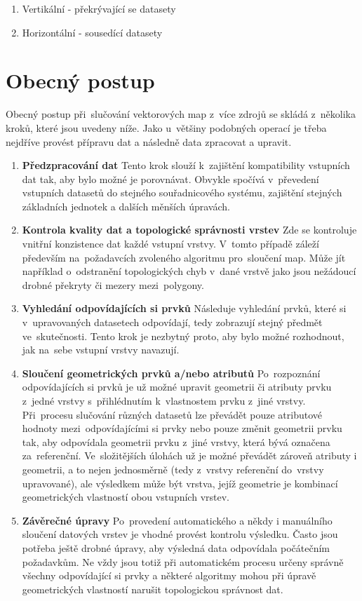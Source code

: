 \begin{enumerate}
  \item Vertikální - překrývající se datasety
  \item Horizontální - sousedící datasety
\end{enumerate}


\section{Obecný postup}

Obecný postup při~slučování vektorových map z~více zdrojů se skládá z~několika kroků, které jsou uvedeny níže. Jako u~většiny podobných operací je třeba nejdříve provést 
přípravu dat a následně data zpracovat a upravit.

\begin{enumerate}
  \item \textbf{Předzpracování dat}
    \subitem Tento krok slouží k~zajištění kompatibility vstupních dat tak, aby bylo možné je porovnávat. Obvykle spočívá v~převedení vstupních datasetů do stejného 
	      souřadnicového systému, zajištění stejných základních jednotek a dalších měnších úpravách. 
  \item \textbf{Kontrola kvality dat a topologické správnosti vrstev}
    \subitem Zde se kontroluje vnitřní konzistence dat každé vstupní vrstvy. V~tomto případě záleží především na~požadavcích zvoleného algoritmu pro~sloučení map. Může jít
	      například o~odstranění topologických chyb v~dané vrstvě jako jsou nežádoucí drobné překryty či mezery mezi~polygony.
  \item \textbf{Vyhledání odpovídajících si prvků}
      \subitem Následuje vyhledání prvků, které si v~upravovaných datasetech odpovídají, tedy zobrazují stejný předmět ve~skutečnosti. Tento krok je nezbytný proto, aby bylo
		možné rozhodnout, jak na~sebe vstupní vrstvy navazují.
  \item \textbf{Sloučení geometrických prvků a/nebo atributů}
      \subitem Po~rozpoznání odpovídajících si prvků je už možné upravit geometrii či atributy prvku z~jedné vrstvy s~přihlédnutím k~vlastnostem prvku z~jiné vrstvy. 
		Při~procesu slučování různých datasetů lze převádět pouze atributové hodnoty mezi~odpovídajícími si prvky nebo pouze změnit geometrii prvku tak, aby odpovídala
		geometrii prvku z~jiné vrstvy, která bývá označena za~referenční. Ve~složitějších úlohách už je možné převádět zároveň atributy i geometrii, a to nejen 
		jednosměrně (tedy z~vrstvy referenční do~vrstvy upravované), ale výsledkem může být vrstva, jejíž geometrie je kombinací geometrických vlastností obou 
		vstupních vrstev.
  \item \textbf{Závěrečné úpravy}
      \subitem Po~provedení automatického a někdy i manuálního sloučení datových vrstev je vhodné provést kontrolu výsledku. Často jsou potřeba ještě drobné úpravy, aby výsledná
		data odpovídala počátečním požadavkům. Ne vždy jsou totiž při automatickém procesu určeny správně všechny odpovídající si prvky a některé algoritmy mohou
		při úpravě geometrických vlastností narušit topologickou správnost dat.
\end{enumerate}
